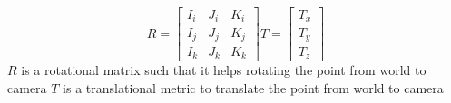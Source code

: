 \documentclass[a4paper, twoside, english]{article}
\begin{document}
\begin{equation*} R = 
\begin{bmatrix}
I_i & J_i & K_i \\
I_j & J_j & K_j \\
I_k & J_k & K_k 
\end{bmatrix}
T=
\begin{bmatrix}
T_x \\
T_y \\
T_z
\end{bmatrix}
\end{equation*}
$R$ is a rotational matrix such that it helps rotating the point from world to camera
$T$ is a translational metric to translate the point from world to camera






\end{document}
